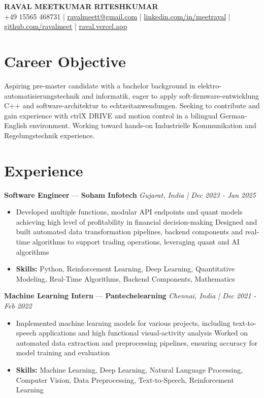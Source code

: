 \documentclass[a4paper,10pt]{article}
\begin{document}
\begin{center}
  {\Large\bfseries RAVAL MEETKUMAR RITESHKUMAR}\\[2pt]
  {\small +49 15565 468731 \;|\; \href{mailto:ravalmeett@gmail.com}{ravalmeett@gmail.com} \;|\; \href{https://www.linkedin.com/in/meetraval/}{linkedin.com/in/meetraval} \;|\; \href{https://github.com/ravalmeet}{github.com/ravalmeet} \;|\; \href{https://raval.vercel.app/}{raval.vercel.app}}
\end{center}
\vspace{-3pt}

\section*{Career Objective}
Aspiring pre-master candidate with a bachelor background in elektro-automatisierungstechnik and informatik, eager to apply soft-firmware-entwicklung C++ and software-architektur to echtzeitanwendungen. Seeking to contribute and gain experience with ctrlX DRIVE and motion control in a bilingual German-English environment. Working toward hands-on Industrielle Kommunikation and Regelungstechnik experience.\par

\section*{Experience}
\textbf{Software Engineer} — \textbf{Soham Infotech} \hfill \textit{Gujarat, India \;|\; Dec 2023 - Jan 2025}\par
\vspace{1pt}
\begin{itemize}
  \item Developed multiple functions, modular API endpoints and quant models achieving high level of profitability in financial decision-making Designed and built automated data transformation pipelines, backend components and real-time algorithms to support trading operations, leveraging quant and AI algorithms
  \item \textbf{Skills:} Python, Reinforcement Learning, Deep Learning, Quantitative Modeling, Real-Time Algorithms, Backend Components, Mathematics
\end{itemize}
\vspace{3pt}
\textbf{Machine Learning Intern} — \textbf{Pantechelearning} \hfill \textit{Chennai, India \;|\; Dec 2021 - Feb 2022}\par
\vspace{1pt}
\begin{itemize}
  \item Implemented machine learning models for various projects, including text-to-speech applications and high functional visual-activity analysis Worked on automated data extraction and preprocessing pipelines, ensuring accuracy for model training and evaluation
  \item \textbf{Skills:} Machine Learning, Deep Learning, Natural Language Processing, Computer Vision, Data Preprocessing, Text-to-Speech, Reinforcement Learning
\end{itemize}
\end{document}
